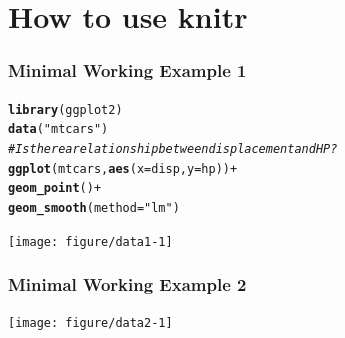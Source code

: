 \documentclass[dvipsnames]{beamer}\usepackage[]{graphicx}\usepackage[]{color}
\makeatletter
\newcommand{\hlstr}[1]{\textcolor[rgb]{0.192,0.494,0.8}{#1}}%
\newcommand{\hlcom}[1]{\textcolor[rgb]{0.678,0.584,0.686}{\textit{#1}}}%
\newcommand{\hlopt}[1]{\textcolor[rgb]{0,0,0}{#1}}%
\newcommand{\hlstd}[1]{\textcolor[rgb]{0.345,0.345,0.345}{#1}}%
\newcommand{\hlkwc}[1]{\textcolor[rgb]{0.333,0.667,0.333}{#1}}%
\newcommand{\hlkwd}[1]{\textcolor[rgb]{0.737,0.353,0.396}{\textbf{#1}}}%
\newenvironment{kframe}{%
 \def\at@end@of@kframe{}%
 \ifinner\ifhmode%
  \def\at@end@of@kframe{\end{minipage}}%
  \begin{minipage}{\columnwidth}%
 \fi\fi%
 \def\FrameCommand##1{\hskip\@totalleftmargin \hskip-\fboxsep
 \colorbox{shadecolor}{##1}\hskip-\fboxsep
     \hskip-\linewidth \hskip-\@totalleftmargin \hskip\columnwidth}%
 \MakeFramed {\advance\hsize-\width
   \@totalleftmargin\z@ \linewidth\hsize
   \@setminipage}}%
 {\par\unskip\endMakeFramed%
 \at@end@of@kframe}
\newenvironment{knitrout}{}{} %
\makeatother
\begin{document}
%

\section{How to use knitr}

%

\begin{frame}[fragile]
  \frametitle{Minimal Working Example 1}
  
\begin{knitrout}\tiny
{}\color{fgcolor}\begin{kframe}
\begin{alltt}
\hlkwd{library}\hlstd{(ggplot2)}
\hlkwd{data}\hlstd{(}\hlstr{"mtcars"}\hlstd{)}
\hlcom{# Is there a relationship between displacement and HP?}
\hlkwd{ggplot}\hlstd{(mtcars,} \hlkwd{aes}\hlstd{(}\hlkwc{x}\hlstd{=disp,} \hlkwc{y}\hlstd{=hp))} \hlopt{+}
\hlkwd{geom_point}\hlstd{()}\hlopt{+}
\hlkwd{geom_smooth}\hlstd{(}\hlkwc{method} \hlstd{=} \hlstr{"lm"}\hlstd{)}
\end{alltt}
\end{kframe}
\texttt{[image: figure/data1-1]} 

\end{knitrout}
    
        
\end{frame}

%

\begin{frame}[fragile]
  \frametitle{Minimal Working Example 2}
  
\begin{knitrout}\tiny
{}\color{fgcolor}
\texttt{[image: figure/data2-1]} 

\end{knitrout}
    
        
\end{frame}
\end{document}

